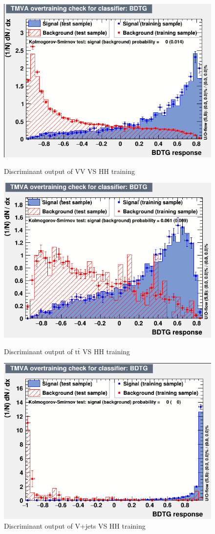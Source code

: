 \begin{figure}[!h]
\begin{minipage}[c]{.5\linewidth}
    \centering
  \includegraphics[width=\textwidth]{figures/2LSS/VV_BDT.png}
  \caption{Discriminant output of VV VS HH training}
  \label{fig:VV_BDT}
\end{minipage}
\begin{minipage}[c]{.5\linewidth}
  \centering
  \includegraphics[width=\textwidth]{figures/2LSS/tt_BDT.png}
  \caption{Discriminant output of $\mathrm{t\bar{t}}$ VS HH training}
  \label{fig:tt_BDT}
\end{minipage}
\begin{minipage}[c]{\linewidth} 
  \centering
  \includegraphics[width=.5\textwidth]{figures/2LSS/Vjets_BDT.png}
  \caption{Discriminant output of V+jets VS HH training}
  \label{fig:Vjets_BDT}
\end{minipage}
\end{figure}

